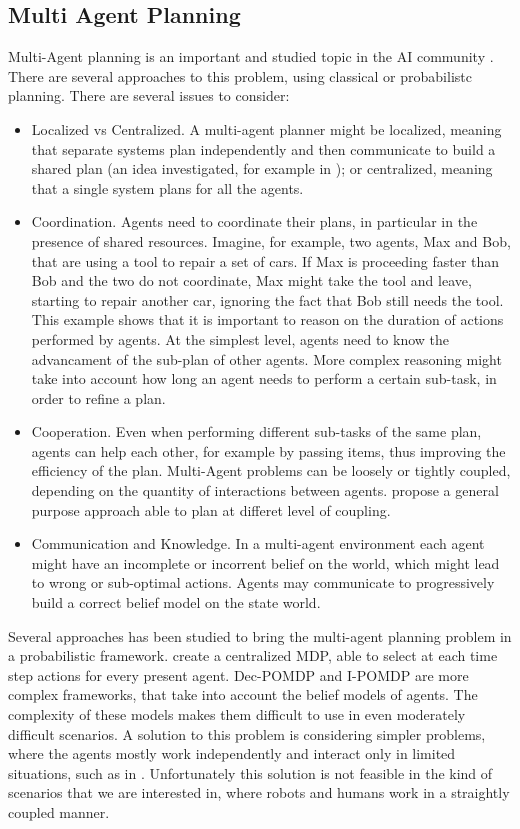 \subsection{Multi Agent Planning}
Multi-Agent planning   is an important and studied topic in the AI community \cite{durfee1999survey}. There are several approaches to this problem, using classical or probabilistc planning. There are several issues to consider:
\begin{itemize}
\item Localized vs Centralized. A multi-agent planner might be localized, meaning that separate systems plan independently and then communicate to build a shared plan (an idea investigated, for example in \cite{nikolaidis2013cross,guestrin2002distributed} ); or centralized, meaning that a single system plans for all the agents.
\item Coordination. Agents need to coordinate their plans, in particular in the presence of shared resources. Imagine, for example, two agents, Max and Bob, that are using a tool to repair a set of cars. If Max is proceeding faster than Bob and the two do not coordinate, Max might take the tool and leave, starting to repair another car, ignoring the fact that Bob still needs the tool. This example shows that it is important to reason on the duration of actions performed by agents. At the simplest level, agents need to know the advancament of the sub-plan of other agents. More complex reasoning might take into account how long an agent needs to perform a certain sub-task, in order to refine a plan. 
\item Cooperation. Even when performing different sub-tasks of the same plan, agents can help each other, for example by passing items, thus improving the efficiency of the plan. Multi-Agent problems can be loosely or tightly coupled, depending on the quantity of interactions between agents. \cite{torreno2015approach} propose a general purpose approach able to plan at differet level of coupling.
\item Communication and Knowledge. In a multi-agent environment each agent might have an incomplete or incorrent belief on the world, which might lead to wrong or sub-optimal actions. Agents may communicate to progressively build a correct belief model on the state world. 
\end{itemize}

Several approaches has been studied to bring the multi-agent planning problem in a probabilistic framework. \cite{boutilier1999sequential} create a centralized MDP, able to select at each time step actions for every present agent. Dec-POMDP \cite{bernstein2002complexity} and I-POMDP \cite{gmytrasiewicz2005framework} are more complex frameworks, that take into account the belief models of agents. The complexity of these models makes them difficult to use in even moderately difficult scenarios. A solution to this problem is considering simpler problems, where the agents mostly work independently and interact only in limited situations, such as in \cite{melo2013heuristic}.  Unfortunately this solution is not feasible in the kind of scenarios that we are interested in, where robots and humans work in a straightly coupled manner. 

